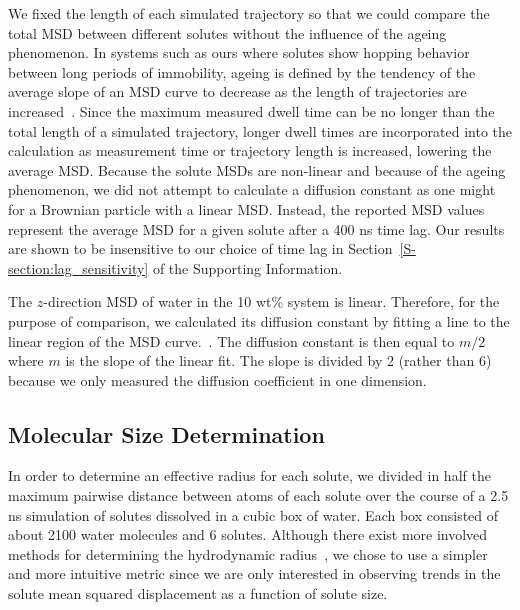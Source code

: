 \documentclass[journal=jpcbfk,manuscript=article]{achemso}
\begin{document}
  We fixed the length of each simulated trajectory so that we could compare the total
  MSD between different solutes without the influence of the ageing phenomenon.
  In systems such as ours where solutes show hopping behavior between long periods 
  of immobility, ageing is defined by the tendency of the average slope of an MSD 
  curve to decrease as the length of trajectories are increased~\cite{metzler_anomalous_2014}.
  Since the maximum measured dwell time can be no longer than the total length of a simulated
  trajectory, longer dwell times are incorporated into the calculation as measurement
  time or trajectory length is increased, lowering the average MSD. Because the solute 
  MSDs are non-linear and because of the ageing phenomenon, we did not attempt to calculate
  a diffusion constant as one might for a Brownian particle with a linear MSD. Instead,
  the reported MSD values represent the average MSD for a given	solute after a 400
  ns time lag. Our results are shown to be insensitive to our choice of time lag in 
  Section~\ref{S-section:lag_sensitivity} of the Supporting Information.
  
  The $z$-direction MSD of water in the 10 wt\% system is linear. Therefore, for
  the purpose of comparison, we calculated its diffusion constant by fitting a line
  to the linear region of the MSD curve.~\cite{maginn_best_2018}. The diffusion constant
  is then equal to $m/2$ where $m$ is the slope of the linear fit. The slope is divided
  by 2 (rather than 6) because we only measured the diffusion coefficient in one 
  dimension.

  \subsection{Molecular Size Determination}\label{method:molecular_size}
  
  In order to determine an effective radius for each solute, we divided in 
  half the maximum pairwise distance between atoms of each solute over the course of
  a 2.5 ns simulation of solutes dissolved in a cubic box of water. Each box 
  consisted of about 2100 water molecules and 6 solutes. Although there exist
  more involved methods for determining the hydrodynamic radius~\cite{schultz_determination_1961},
  we chose to use a simpler and more intuitive metric since we are only interested
  in observing trends in the solute mean squared displacement as a function
  of solute size.
  
\end{document}
